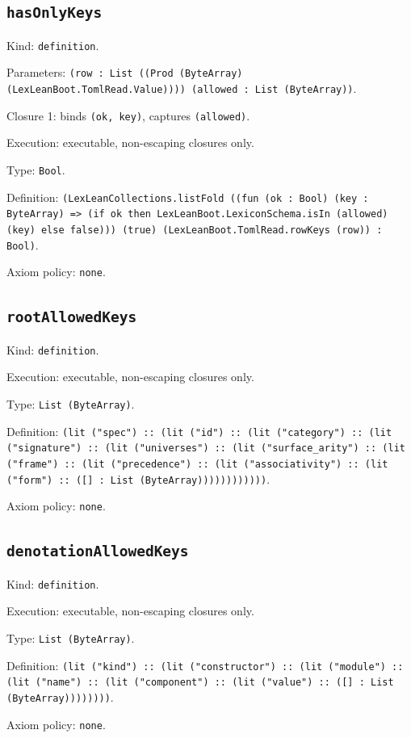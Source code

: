 \documentclass[11pt]{article}
\begin{document}
\subsection*{\texttt{hasOnlyKeys}}
\noindent Kind: \texttt{definition}.\par
\noindent Parameters: \texttt{(row : List ((Prod (ByteArray) (LexLeanBoot.TomlRead.Value)))) (allowed : List (ByteArray))}.\par
\noindent Closure 1: binds \texttt{(ok, key)}, captures \texttt{(allowed)}.\par
\noindent Execution: executable, non-escaping closures only.\par
\noindent Type: \texttt{Bool}.\par
\noindent Definition: \texttt{(LexLeanCollections.listFold ((fun (ok : Bool) (key : ByteArray) => (if ok then LexLeanBoot.LexiconSchema.isIn (allowed) (key) else false))) (true) (LexLeanBoot.TomlRead.rowKeys (row)) : Bool)}.\par
\noindent Axiom policy: \texttt{none}.\par
\subsection*{\texttt{rootAllowedKeys}}
\noindent Kind: \texttt{definition}.\par
\noindent Execution: executable, non-escaping closures only.\par
\noindent Type: \texttt{List (ByteArray)}.\par
\noindent Definition: \texttt{(lit ("spec") :: (lit ("id") :: (lit ("category") :: (lit ("signature") :: (lit ("universes") :: (lit ("surface\_arity") :: (lit ("frame") :: (lit ("precedence") :: (lit ("associativity") :: (lit ("form") :: ([] : List (ByteArray))))))))))))}.\par
\noindent Axiom policy: \texttt{none}.\par
\subsection*{\texttt{denotationAllowedKeys}}
\noindent Kind: \texttt{definition}.\par
\noindent Execution: executable, non-escaping closures only.\par
\noindent Type: \texttt{List (ByteArray)}.\par
\noindent Definition: \texttt{(lit ("kind") :: (lit ("constructor") :: (lit ("module") :: (lit ("name") :: (lit ("component") :: (lit ("value") :: ([] : List (ByteArray))))))))}.\par
\noindent Axiom policy: \texttt{none}.\par
\end{document}
